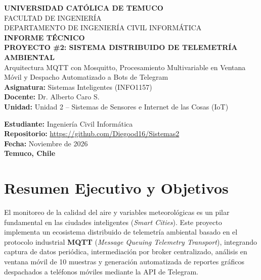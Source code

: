 \documentclass[12pt,letterpaper]{article}
\begin{document}
\begin{titlepage}
    \centering
    \vspace*{1.5cm}
    {\Large\textbf{UNIVERSIDAD CATÓLICA DE TEMUCO}}\\[0.3cm]
    {\large FACULTAD DE INGENIERÍA}\\[0.2cm]
    {\large DEPARTAMENTO DE INGENIERÍA CIVIL INFORMÁTICA}\\[2.5cm]
    
    {\LARGE\bfseries INFORME TÉCNICO}\\[0.4cm]
    {\Large\bfseries PROYECTO \#2: SISTEMA DISTRIBUIDO DE TELEMETRÍA AMBIENTAL}\\[0.5cm]
    {\large Arquitectura MQTT con Mosquitto, Procesamiento Multivariable en Ventana Móvil y Despacho Automatizado a Bots de Telegram}\\[2.5cm]
    
    \textbf{Asignatura:} Sistemas Inteligentes (INFO1157)\\[0.2cm]
    \textbf{Docente:} Dr. Alberto Caro S.\\[0.2cm]
    \textbf{Unidad:} Unidad 2 -- Sistemas de Sensores e Internet de las Cosas (IoT)\\[2.0cm]
    
    \begin{flushright}
        \textbf{Estudiante:} Ingeniería Civil Informática\\
        \textbf{Repositorio:} \url{https://github.com/Diegood16/Sistemas2}\\
        \textbf{Fecha:} Noviembre de 2026\\
        \textbf{Temuco, Chile}
    \end{flushright}
    \vfill
\end{titlepage}

\newpage
\tableofcontents
\newpage

\section{Resumen Ejecutivo y Objetivos}

El monitoreo de la calidad del aire y variables meteorológicas es un pilar fundamental en las ciudades inteligentes (\textit{Smart Cities}). Este proyecto implementa un ecosistema distribuido de telemetría ambiental basado en el protocolo industrial \textbf{MQTT} (\textit{Message Queuing Telemetry Transport}), integrando captura de datos periódica, intermediación por broker centralizado, análisis en ventana móvil de 10 muestras y generación automatizada de reportes gráficos despachados a teléfonos móviles mediante la API de Telegram.
\end{document}
